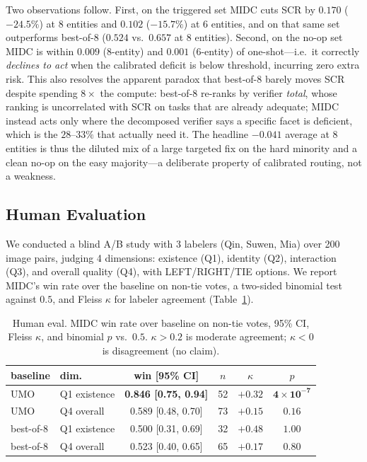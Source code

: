 \documentclass[letterpaper]{article}
\begin{document}
Two observations follow. First, on the triggered set MIDC cuts SCR by $0.170$ ($-24.5\%$) at 8 entities and $0.102$ ($-15.7\%$) at 6 entities, and on that same set outperforms best-of-8 ($0.524$ vs.\ $0.657$ at 8 entities). Second, on the no-op set MIDC is within $0.009$ (8-entity) and $0.001$ (6-entity) of one-shot---i.e.\ it correctly \emph{declines to act} when the calibrated deficit is below threshold, incurring zero extra risk. This also resolves the apparent paradox that best-of-8 barely moves SCR despite spending $8\times$ the compute: best-of-8 re-ranks by verifier \emph{total}, whose ranking is uncorrelated with SCR on tasks that are already adequate; MIDC instead acts only where the decomposed verifier says a specific facet is deficient, which is the $28$--$33\%$ that actually need it. The headline $-0.041$ average at 8 entities is thus the diluted mix of a large targeted fix on the hard minority and a clean no-op on the easy majority---a deliberate property of calibrated routing, not a weakness.

\subsection{Human Evaluation}
\label{sec:human}

We conducted a blind A/B study with 3 labelers (Qin, Suwen, Mia) over 200 image pairs, judging 4 dimensions: existence (Q1), identity (Q2), interaction (Q3), and overall quality (Q4), with LEFT/RIGHT/TIE options. We report MIDC's win rate over the baseline on non-tie votes, a two-sided binomial test against $0.5$, and Fleiss $\kappa$ for labeler agreement (Table~\ref{tab:human}).

\begin{table}[ht]
\centering
\small
\setlength{\tabcolsep}{4pt}
\caption{Human eval. MIDC win rate over baseline on non-tie votes, 95\% CI, Fleiss $\kappa$, and binomial $p$ vs.\ $0.5$. $\kappa>0.2$ is moderate agreement; $\kappa<0$ is disagreement (no claim).}
\label{tab:human}
\begin{tabular}{llcccc}
\toprule
baseline & dim. & win [95\% CI] & $n$ & $\kappa$ & $p$ \\
\midrule
UMO & Q1 existence & \textbf{0.846 [0.75, 0.94]} & 52 & $+0.32$ & $\mathbf{4{\times}10^{-7}}$ \\
UMO & Q4 overall  & 0.589 [0.48, 0.70] & 73 & $+0.15$ & $0.16$ \\
\midrule
best-of-8 & Q1 existence & 0.500 [0.31, 0.69] & 32 & $+0.48$ & $1.00$ \\
best-of-8 & Q4 overall  & 0.523 [0.40, 0.65] & 65 & $+0.17$ & $0.80$ \\
\bottomrule
\end{tabular}
\end{table}
\end{document}
